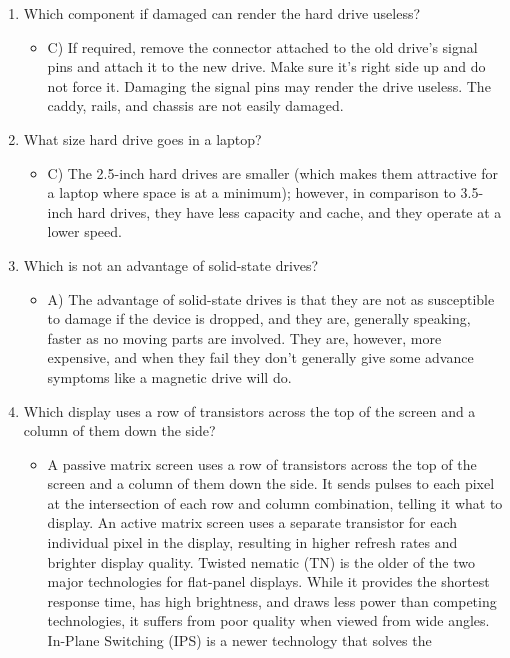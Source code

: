 \documentclass{article}
\begin{document}
\begin{enumerate}
     \item Which component if damaged can render the hard drive useless?
    \begin{itemize}
        \item C) If required, remove the connector attached to the old drive’s signal pins and attach it
to the new drive. Make sure it’s right side up and do not force it. Damaging the signal pins
may render the drive useless. The caddy, rails, and chassis are not easily damaged.
    \end{itemize}
     \item What size hard drive goes in a laptop?
    \begin{itemize}
        \item C) The 2.5-inch hard drives are smaller (which makes them attractive for a laptop where
space is at a minimum); however, in comparison to 3.5-inch hard drives, they have less
capacity and cache, and they operate at a lower speed.
    \end{itemize}
     \item Which is not an advantage of solid-state drives?
    \begin{itemize}
        \item A) The advantage of solid-state drives is that they are not as susceptible to damage if the
device is dropped, and they are, generally speaking, faster as no moving parts are involved.
They are, however, more expensive, and when they fail they don’t generally give some
advance symptoms like a magnetic drive will do.
    \end{itemize}
     \item Which display uses a row of transistors across the top of the screen and a column of them
down the side?
    \begin{itemize}
        \item A passive matrix screen uses a row of transistors across the top of the screen and a
column of them down the side. It sends pulses to each pixel at the intersection of each row
and column combination, telling it what to display. An active matrix screen uses a separate
transistor for each individual pixel in the display, resulting in higher refresh rates and
brighter display quality. Twisted nematic (TN) is the older of the two major technologies
for flat-panel displays. While it provides the shortest response time, has high brightness,
and draws less power than competing technologies, it suffers from poor quality when
viewed from wide angles. In-Plane Switching (IPS) is a newer technology that solves the

\end{itemize}
\end{enumerate}
\end{document}
